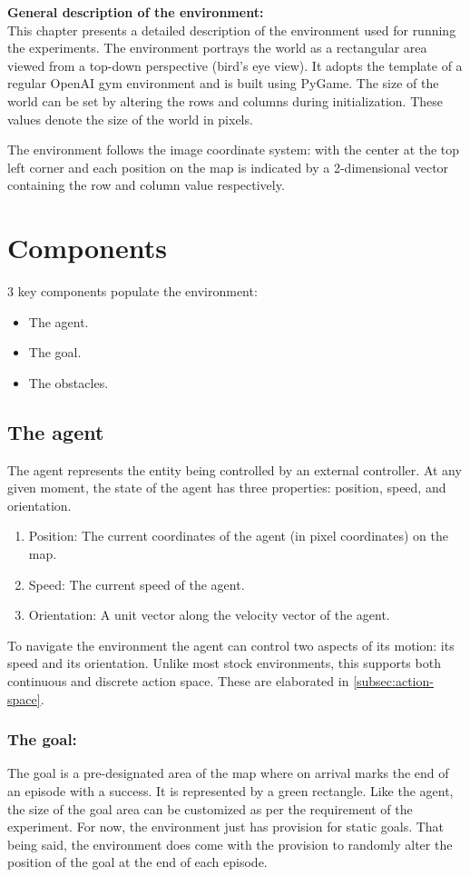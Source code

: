\textbf{General description of the environment:}\\
\label{ch:enviornment}
This chapter presents a detailed description of the environment used for running the experiments. The environment portrays the world as a rectangular area viewed from a top-down perspective (bird's eye view). It adopts the template of a regular OpenAI gym environment and is built using PyGame.
The size of the world can be set by altering the rows and columns during initialization. These values denote the size of the world in pixels.

The environment follows the image coordinate system: with the center at the top left corner and each position on the map is indicated by a 2-dimensional vector containing the row and column value respectively.\\
\section{Components}
3 key components populate the environment: 
\begin{itemize}
    \item The agent.
    \item The goal.
    \item The obstacles.
\end{itemize}
\subsection{The agent}
The agent represents the entity being controlled by an external controller. At any given moment, the state of the agent has three properties: position, speed, and orientation.
\begin{enumerate}
    \item Position: The current coordinates of the agent (in pixel coordinates) on the map.
    \item Speed: The current speed of the agent.
    \item Orientation: A unit vector along the velocity vector of the agent.
\end{enumerate}
To navigate the environment the agent can control two aspects of its motion: its speed and its orientation.
Unlike most stock environments, this supports both continuous and discrete action space. These are elaborated in \autoref{subsec:action-space}.
\subsubsection{The goal:}
The goal is a pre-designated area of the map where on arrival marks the end of an episode with a success. It is represented by a green rectangle. Like the agent, the size of the goal area can be customized as per the requirement of the experiment. For now, the environment just has provision for static goals. That being said, the environment does come with the provision to randomly alter the position of the goal at the end of each episode.


